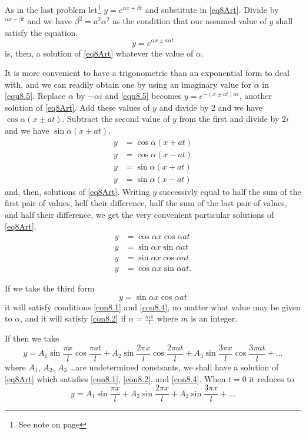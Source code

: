 \documentclass[oneside,12pt]{book}
\begin{document}
As in the last problem let\footnote{See note on page \pageref{note2}} $y=e^{\alpha x+\beta t}$ and substitute in \eqref{eq8Art}. Divide by $^{\alpha x+\beta t}$ and we have $\beta^2=a^2\alpha^2$ as the condition that our assumed value of $y$ shall satisfy the equation. 
\begin{equation}
    y=e^{\alpha x \pm a\alpha t}
    \label{equ8.5}
\end{equation}
is, then, a solution of \eqref{eq8Art} whatever the value of $\alpha$. \par 

It is more convenient to have a trigonometric than an exponential form to deal with, and we can readily obtain one by using an imaginary value for $\alpha$ in \eqref{equ8.5}. Replace $\alpha$ by $-\alpha i$ and \eqref{equ8.5} becomes $y=e^{-(x\pm at)\alpha i}$, another solution of \eqref{eq8Art}. Add these values of $y$ and divide by 2 and we have $\cos\alpha(x\pm at)$. Subtract the second value of $y$ from the first and divide by $2i$ and we have $\sin\alpha(x\pm at)$. 
\begin{align*}
    y&=\cos\alpha(x+at)\\
    y&=\cos\alpha(x-at)\\
    y&=\sin\alpha(x+at)\\
    y&=\sin\alpha(x-at)
\end{align*}
and, then, solutions of \eqref{eq8Art}. Writing $y$ successivly equal to half the sum of the first pair of values, helf their difference, half the sum of the last pair of values, and half their difference, we get the very convenient particular solutions of \eqref{eq8Art}. 
\begin{align*}
    y&=\cos\alpha x\cos\alpha at \\
    y&=\sin\alpha x\sin\alpha at \\
    y&=\sin\alpha x\cos\alpha at \\
    y&=\cos\alpha x\sin\alpha at.
\end{align*} \par 

If we take the third form 
$$y=\sin\alpha x\cos\alpha at$$ 
it will satisfy conditions \eqref{con8.1} and \eqref{con8.4}, no matter what value may be given to $\alpha$, and it will satisfy \eqref{con8.2} if $\alpha=\frac{m\pi}{l}$ where $m$ is an integer. \par 

If then we take 
\begin{equation}
    y=A_1\sin\frac{\pi x}{l}\cos\frac{\pi at}{l}+A_2\sin\frac{2\pi x}{l}\cos\frac{2\pi at}{l}+A_3\sin\frac{3\pi x}{l}\cos\frac{3\pi at}{l}+\dots
    \label{equ8.6}
\end{equation}
where $A_1$, $A_2$, $A_3$ \dots are undetermined constsants, we shall have a solution of \eqref{eq8Art} which satisfies \eqref{con8.1}, \eqref{con8.2}, and \eqref{con8.4}. When $t=0$ it reduces to 
\begin{equation}
    y=A_1\sin\frac{\pi x}{l}+A_2\sin\frac{2\pi x}{l}+A_3\sin\frac{3\pi x}{l} +\dots 
    \label{equ8.7}
\end{equation} \par 
\end{document}
